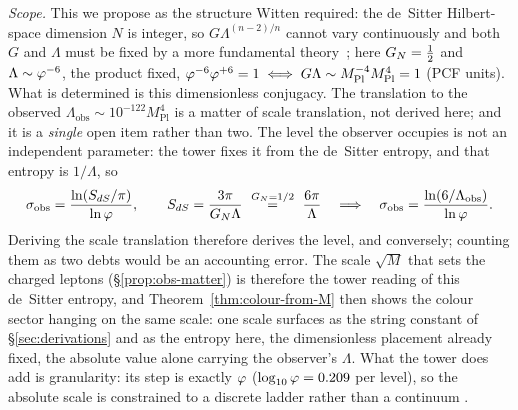 \begin{remark}
\emph{Scope.} This we propose as the structure Witten required: the de~Sitter
Hilbert-space dimension $N$ is integer, so $G\Lambda^{(n-2)/n}$ cannot vary
continuously and both $G$ and $\Lambda$ must be fixed by a more fundamental
theory~\cite{Witten01dS}; here $G_{N}=\tfrac12$ and $\Lambda\sim\varphi^{-6}$, the
product fixed, $\varphi^{-6}\varphi^{+6}=1\iff G\Lambda\sim
M_{\mathrm{Pl}}^{-4}M_{\mathrm{Pl}}^{4}=1$ (PCF units). What is determined is this
dimensionless conjugacy. The translation to the observed
$\Lambda_{\mathrm{obs}}\sim10^{-122}M_{\mathrm{Pl}}^{4}$ is a matter of scale translation, not
derived here; and it is a \emph{single} open item rather than two. The level the observer occupies
is not an independent parameter: the tower fixes it from the de~Sitter entropy, and that entropy is
$1/\Lambda$, so
\begin{equation}\label{eq:sigma-obs}
  \sigma_{\mathrm{obs}}=\frac{\ln(S_{dS}/\pi)}{\ln\golden},\qquad
  S_{dS}=\frac{3\pi}{\GN\Lambda}\ \overset{\GN=1/2}{=}\ \frac{6\pi}{\Lambda}
  \quad\Longrightarrow\quad
  \sigma_{\mathrm{obs}}=\frac{\ln(6/\Lambda_{\mathrm{obs}})}{\ln\golden}.
\end{equation}
Deriving the scale translation therefore derives the level, and conversely; counting them as two
debts would be an accounting error. The scale $\sqrt M$ that sets the charged leptons (\S\ref{prop:obs-matter}) is therefore the tower reading of this de~Sitter entropy, and Theorem~\ref{thm:colour-from-M} then shows the colour sector hanging on the same scale: one scale surfaces as the string constant of \S\ref{sec:derivations} and as the entropy here, the dimensionless placement already fixed, the absolute value alone carrying the observer's $\Lambda$. What the tower does add is granularity: its step is exactly
$\varphi$ ($\log_{10}\varphi=0.209$ per level), so the absolute scale is constrained to a discrete
ladder rather than a continuum .

\end{remark}

